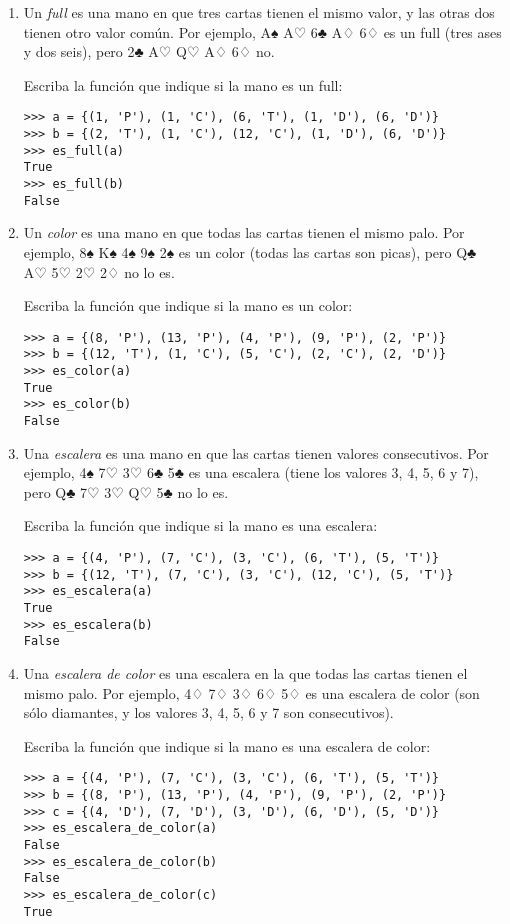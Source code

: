 \begin{enumerate}
\item
  Un \emph{full} es una mano en que tres cartas tienen el mismo valor, y
  las otras dos tienen otro valor común.
  Por ejemplo,
  A♠ A♡ 6♣ A♢ 6♢
  es un full (tres ases y dos seis), pero
  2♣ A♡ Q♡ A♢ 6♢
  no.

  Escriba la función que indique si la mano es un full:
\begin{lstlisting}
>>> a = {(1, 'P'), (1, 'C'), (6, 'T'), (1, 'D'), (6, 'D')}
>>> b = {(2, 'T'), (1, 'C'), (12, 'C'), (1, 'D'), (6, 'D')}
>>> es_full(a)
True
>>> es_full(b)
False
\end{lstlisting}

\item
  Un \emph{color} es una mano en que todas las cartas tienen el mismo
  palo.
  Por ejemplo,
  8♠ K♠ 4♠ 9♠ 2♠
  es un color (todas las cartas son picas), pero
  Q♣ A♡ 5♡ 2♡ 2♢
  no lo es.

  Escriba la función que indique si la mano es un color:
\begin{lstlisting}
>>> a = {(8, 'P'), (13, 'P'), (4, 'P'), (9, 'P'), (2, 'P')}
>>> b = {(12, 'T'), (1, 'C'), (5, 'C'), (2, 'C'), (2, 'D')}
>>> es_color(a)
True
>>> es_color(b)
False
\end{lstlisting}

\item
  Una \emph{escalera} es una mano en que las cartas tienen valores
  consecutivos. Por ejemplo,
  4♠ 7♡ 3♡ 6♣ 5♣
  es una escalera (tiene los valores 3, 4, 5, 6 y 7), pero
  Q♣ 7♡ 3♡ Q♡ 5♣
  no lo es.

  Escriba la función que indique si la mano es una escalera:
\begin{lstlisting}
>>> a = {(4, 'P'), (7, 'C'), (3, 'C'), (6, 'T'), (5, 'T')}
>>> b = {(12, 'T'), (7, 'C'), (3, 'C'), (12, 'C'), (5, 'T')}
>>> es_escalera(a)
True
>>> es_escalera(b)
False
\end{lstlisting}

\item
  Una \emph{escalera de color} es una escalera en la que todas las
  cartas tienen el mismo palo. Por ejemplo,
  4♢ 7♢ 3♢ 6♢ 5♢
  es una escalera de color (son sólo diamantes, y los valores
  3, 4, 5, 6 y 7 son consecutivos).

  Escriba la función que indique si la mano es una escalera de color:
\begin{lstlisting}
>>> a = {(4, 'P'), (7, 'C'), (3, 'C'), (6, 'T'), (5, 'T')}
>>> b = {(8, 'P'), (13, 'P'), (4, 'P'), (9, 'P'), (2, 'P')}
>>> c = {(4, 'D'), (7, 'D'), (3, 'D'), (6, 'D'), (5, 'D')}
>>> es_escalera_de_color(a)
False
>>> es_escalera_de_color(b)
False
>>> es_escalera_de_color(c)
True
\end{lstlisting}


\end{enumerate}
